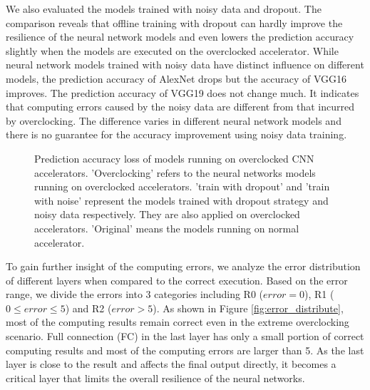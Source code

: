 We also evaluated the models trained with noisy data and dropout. 
The comparison reveals that offline training with dropout can hardly 
improve the resilience of the neural network models and even lowers the 
prediction accuracy slightly when the models are executed on the 
overclocked accelerator. While neural network models trained with 
noisy data have distinct influence on different models, the 
prediction accuracy of AlexNet drops but the accuracy of VGG16 
improves. The prediction accuracy of VGG19 does not change much.
It indicates that computing errors caused by the noisy data are 
different from that incurred by overclocking. The difference varies 
in different neural network models and there is no guarantee 
for the accuracy improvement using noisy data training.
\begin{figure}
        \center
        \qquad
        \caption{Prediction accuracy loss of models running on overclocked CNN accelerators.
			'Overclocking' refers to the neural networks models running on overclocked accelerators. 
'train with dropout' and 'train with noise' represent the models trained with dropout strategy 
and noisy data respectively. They are also applied on overclocked accelerators. 
'Original' means the models running on normal accelerator.
 }
 \vspace{-1em}
        \label{fig:accuracy-dropout-noisy}
\end{figure}

To gain further insight of the computing errors, we analyze the error distribution 
of different layers when compared to the correct execution. Based on the error range, 
we divide the errors into 3 categories including R0 ($error = 0$), 
R1 ($0 \leq error \leq 5$) and R2 ($error > 5$). As shown in 
Figure \ref{fig:error_distribute}, most of the computing results remain 
correct even in the extreme overclocking scenario. Full connection (FC) in the last layer 
has only a small portion of correct computing results and most of the computing errors are 
larger than 5. As the last layer is close to the result and affects the final output 
directly, it becomes a critical layer that limits the overall resilience of the neural 
networks. 

